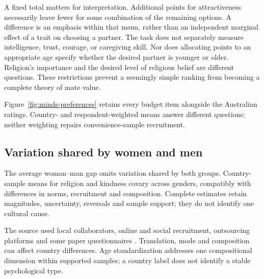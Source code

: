 

A fixed total matters for interpretation. Additional points for attractiveness necessarily leave fewer for some combination of the remaining options. A difference is an emphasis within that menu, rather than an independent marginal effect of a trait on choosing a partner. The task does not separately measure intelligence, trust, courage, or caregiving skill. Nor does allocating points to an appropriate age specify whether the desired partner is younger or older. Religion's importance and the desired level of religious belief are different questions. These restrictions prevent a seemingly simple ranking from becoming a complete theory of mate value.

Figure~\ref{fig:minds-preferences} retains every budget item alongside the Australian ratings. Country- and respondent-weighted means answer different questions; neither weighting repairs convenience-sample recruitment.


\subsection{Variation shared by women and men}

The average woman--man gap omits variation shared by both groups. Country-sample means for religion and kindness covary across genders, compatibly with differences in norms, recruitment and composition. Complete estimates retain magnitudes, uncertainty, reversals and sample support; they do not identify one cultural cause.



The source used local collaborators, online and social recruitment, outsourcing platforms and some paper questionnaires \citep{kowal2025}. Translation, mode and composition can affect country differences. Age standardization addresses one compositional dimension within supported samples; a country label does not identify a stable psychological type.

